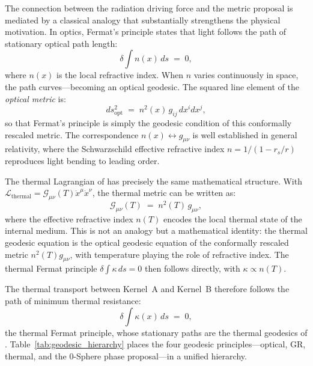 \documentclass[%
 reprint, amsmath,amssymb, aps, prb, ]{revtex4-2}
\numberwithin{equation}{section}
\begin{document}
The connection between the radiation driving force and the metric proposal is mediated by a classical analogy that substantially strengthens the physical motivation. In optics, Fermat's principle states that light follows the path of stationary optical path length:
\begin{equation}
\delta \int n(x)\,ds \;=\; 0,
\label{eq:fermat}
\end{equation}
where $n(x)$ is the local refractive index. When $n$ varies continuously in space, the path curves---becoming an optical geodesic. The squared line element of the \emph{optical metric} is:
\begin{equation}
ds_{\mathrm{opt}}^2 \;=\; n^2(x)\,g_{ij}\,dx^i dx^j,
\label{eq:optical_metric}
\end{equation}
so that Fermat's principle is simply the geodesic condition of this conformally rescaled metric. The correspondence $n(x) \leftrightarrow g_{\mu\nu}$ is well established in general relativity, where the Schwarzschild effective refractive index $n = 1/(1-r_s/r)$ reproduces light bending to leading order.

The thermal Lagrangian of \cite{hanamura24} has precisely the same mathematical structure. With $\mathcal{L}_{\mathrm{thermal}} = \mathcal{G}_{\mu\nu}(T)\dot{x}^\mu\dot{x}^\nu$, the thermal metric can be written as:
\begin{equation}
\mathcal{G}_{\mu\nu}(T) \;=\; n^2(T)\,g_{\mu\nu},
\label{eq:thermal_optical_metric}
\end{equation}
where the effective refractive index $n(T)$ encodes the local thermal state of the internal medium. This is not an analogy but a mathematical identity: the thermal geodesic equation is the optical geodesic equation of the conformally rescaled metric $n^2(T)g_{\mu\nu}$, with temperature playing the role of refractive index. The thermal Fermat principle $\delta\int\kappa\,ds = 0$ then follows directly, with $\kappa \propto n(T)$.

The thermal transport between Kernel~A and Kernel~B therefore follows the path of minimum thermal resistance:
\begin{equation}
\delta \int \kappa(x)\,ds \;=\; 0,
\label{eq:thermal_fermat}
\end{equation}
the thermal Fermat principle, whose stationary paths are the thermal geodesics of \cite{hanamura24}. Table~\ref{tab:geodesic_hierarchy} places the four geodesic principles---optical, GR, thermal, and the 0-Sphere phase proposal---in a unified hierarchy.
\end{document}

